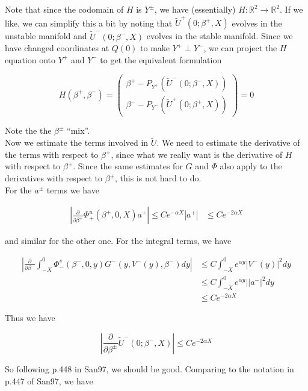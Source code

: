 \documentclass[12pt]{article}
\def\R{{\mathbb R}}
\begin{document}
Note that since the codomain of $H$ is $Y^\pm$, we have (essentially) $H:\R^2 \rightarrow \R^2$. If we like, we can simplify this a bit by noting that $\tilde{U}^+(0; \beta^+, X)$ evolves in the unstable manifold and $\tilde{U}^-(0; \beta^-, X)$ evolves in the stable manifold. Since we have changed coordinates at $Q(0)$ to make $Y^+ \perp Y^-$, we can project the $H$ equation onto $Y^+$ and $Y^-$ to get the equivalent formulation

\begin{equation}
H(\beta^+, \beta^-) = 
\begin{pmatrix}
\beta^+ - P_{Y^+}(\tilde{U}^-(0; \beta^-, X)) \\
\beta^- - P_{Y^-}(\tilde{U}^+(0; \beta^+, X)) 
\end{pmatrix}
= 0
\end{equation}

Note the the $\beta^\pm$ ``mix''.\\

Now we estimate the terms involved in $\tilde{U}$. We need to estimate the derivative of the terms with respect to $\beta^\pm$, since what we really want is the derivative of $H$ with respect to $\beta^\pm$. Since the same estimates for $G$ and $\Phi$ also apply to the derivatives with respect to $\beta^\pm$, this is not hard to do.\\

For the $a^\pm$ terms we have

\begin{align*}
\left| \frac{\partial}{\partial \beta^+} \Phi^u_+(\beta^+, 0, X) a^+ \right| \leq C e^{-\alpha X}|a^+|
& \leq C  e^{-2 \alpha X}
\end{align*}

and similar for the other one. For the integral terms, we have

\begin{align*}
\left| \frac{\partial}{\partial \beta^-} \int_{-X}^0 \Phi_-^s(\beta^-, 0, y) G^-(y, V^-(y),\beta^-)dy \right| 
&\leq C \int_{-X}^0 e^{\alpha y} | V^-(y) |^2 dy \\
&\leq C \int_{-X}^0 e^{\alpha y} | |a^-|^2 dy \\
&\leq C e^{-2 \alpha X}
\end{align*}

Thus we have

\[
\left| \frac{\partial}{\partial \beta^\pm} \tilde{U}^-(0; \beta^-, X) \right| 
\leq C e^{-2 \alpha X}
\]

So following p.448 in San97, we should be good. Comparing to the notation in p.447 of San97, we have
\end{document}
